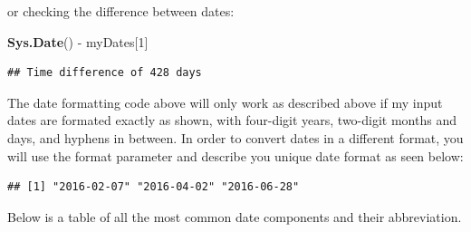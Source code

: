 \documentclass[]{book}
\newenvironment{Shaded}{\begin{snugshade}}{\end{snugshade}}
\newcommand{\KeywordTok}[1]{\textcolor[rgb]{0.13,0.29,0.53}{\textbf{{#1}}}}
\newcommand{\DataTypeTok}[1]{\textcolor[rgb]{0.13,0.29,0.53}{{#1}}}
\newcommand{\DecValTok}[1]{\textcolor[rgb]{0.00,0.00,0.81}{{#1}}}
\newcommand{\StringTok}[1]{\textcolor[rgb]{0.31,0.60,0.02}{{#1}}}
\newcommand{\CommentTok}[1]{\textcolor[rgb]{0.56,0.35,0.01}{\textit{{#1}}}}
\newcommand{\NormalTok}[1]{{#1}}
\begin{document}
or checking the difference between dates:

\begin{Shaded}
\begin{Highlighting}[]
\KeywordTok{Sys.Date}\NormalTok{() -}\StringTok{ }\NormalTok{myDates[}\DecValTok{1}\NormalTok{]}
\end{Highlighting}
\end{Shaded}

\begin{verbatim}
## Time difference of 428 days
\end{verbatim}

The date formatting code above will only work as described above if my
input dates are formated exactly as shown, with four-digit years,
two-digit months and days, and hyphens in between. In order to convert
dates in a different format, you will use the format parameter and
describe you unique date format as seen below:

\begin{Shaded}
\end{Shaded}

\begin{verbatim}
## [1] "2016-02-07" "2016-04-02" "2016-06-28"
\end{verbatim}

Below is a table of all the most common date components and their
abbreviation.
\end{document}
